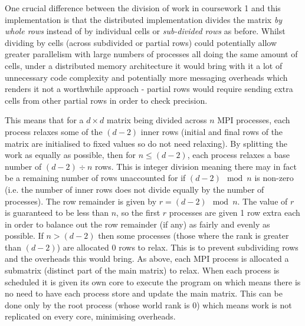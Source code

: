 \documentclass[11pt]{article}
\begin{document}
One crucial difference between the division of work in coursework 1 and this implementation is that the distributed implementation divides the matrix \textit{by whole rows} instead of by individual cells or \textit{sub-divided rows} as before. Whilst dividing by cells (across subdivided or partial rows) could potentially allow greater parallelism with large numbers of processes all doing the same amount of cells, under a distributed memory architecture it would bring with it a lot of unnecessary code complexity and potentially more messaging overheads which renders it not a worthwhile approach - partial rows would require sending extra cells from other partial rows in order to check precision.

This means that for a $d \times d$ matrix being divided across $n$ MPI processes, each process relaxes some of the $(d-2)$ inner rows (initial and final rows of the matrix are initialised to fixed values so do not need relaxing). By splitting the work as equally as possible, then for $n\leq(d-2)$, each process relaxes a base number of $(d-2) \div n$ rows. This is integer division meaning there may in fact be a remaining number of rows unaccounted for if $(d-2) \mod n$ is non-zero (i.e. the number of inner rows does not divide equally by the number of processes). The row remainder is given by $r=(d-2) \mod n$. The value of $r$ is guaranteed to be less than $n$, so the first $r$ processes are given 1 row extra each in order to balance out the row remainder (if any) as fairly and evenly as possible. If $n>(d-2)$ then some processes (those where the rank is greater than $(d-2)$) are allocated 0 rows to relax. This is to prevent subdividing rows and the overheads this would bring. As above, each MPI process is allocated a submatrix (distinct part of the main matrix) to relax. When each process is scheduled it is given its own core to execute the program on which means there is no need to have each process store and update the main matrix. This can be done only by the root process (whose world rank is 0) which means work is not replicated on every core, minimising overheads.
\end{document}
